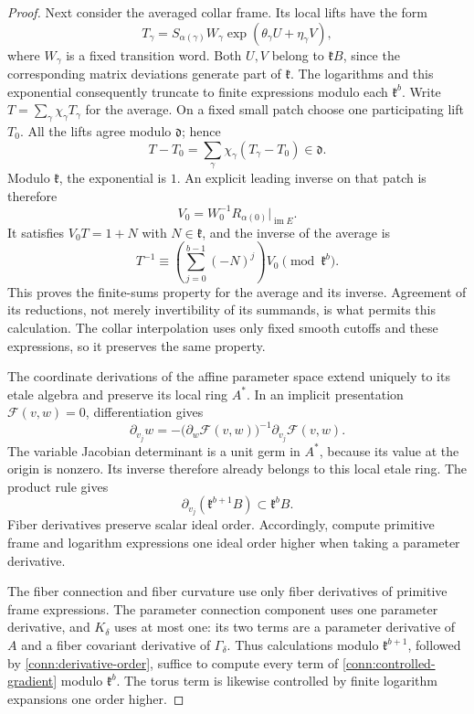 \begin{proof}
Next consider the averaged collar frame.  Its local lifts have
the form
\[
 T_\gamma=S_{\alpha(\gamma)}W_\gamma
                       \exp(\theta_\gamma U+\eta_\gamma V),
\]
where \(W_\gamma\) is a fixed transition word.  Both \(U,V\)
belong to \(\mathfrak kB\), since the corresponding matrix
deviations generate part of \(\mathfrak k\).  The logarithms
and this exponential consequently truncate to finite
expressions modulo each \(\mathfrak k^b\).  Write
\(T=\sum_\gamma\chi_\gamma T_\gamma\) for the average.
On a fixed small patch choose one participating lift \(T_0\).
All the lifts agree modulo \(\mathfrak d\); hence
\[
 T-T_0=\sum_\gamma\chi_\gamma(T_\gamma-T_0)
                                           \in\mathfrak d.
\]
Modulo \(\mathfrak k\), the exponential is \(1\).
An explicit leading inverse on that patch is therefore
\[
 V_0=W_0^{-1}R_{\alpha(0)}
                       \big|_{\operatorname{im}E}.
\]
It satisfies \(V_0T=1+N\) with \(N\in\mathfrak k\), and the
inverse of the average is
\begin{equation}
 T^{-1}\equiv
       \left(\sum_{j=0}^{b-1}(-N)^j\right)V_0
                                      \pmod{\mathfrak k^b}.
 \label{conn:average-inverse}
\end{equation}
This proves the finite-sums property for the average and its
inverse.  Agreement of its reductions, not merely invertibility
of its summands, is what permits this calculation.
The collar interpolation uses only fixed smooth cutoffs and
these expressions, so it preserves the same property.

The coordinate derivations of the affine parameter space
extend uniquely to its etale algebra and preserve its local
ring \(A^*\).  In an implicit presentation $\mathcal F(v,w)=0$, differentiation
gives
\[
 \partial_{v_j}w
 =-\bigl(\partial_w\mathcal F(v,w)\bigr)^{-1}
                           \partial_{v_j}\mathcal F(v,w).
\]
The variable Jacobian determinant is a unit germ in \(A^*\), because
its value at the origin is nonzero.  Its inverse therefore already
belongs to this local etale ring.
The product rule gives
\begin{equation}
 \partial_{v_j}(\mathfrak k^{b+1}B)
                                     \subset\mathfrak k^bB.
 \label{conn:derivative-order}
\end{equation}
Fiber derivatives preserve scalar ideal order.  Accordingly,
compute primitive frame and logarithm expressions one ideal
order higher when taking a parameter derivative.

The fiber connection and fiber curvature use only fiber
derivatives of primitive frame expressions.
The parameter connection component uses one parameter
derivative, and \(K_\delta\) uses at most one: its two terms
are a parameter derivative of \(A\) and a fiber covariant
derivative of \(\Gamma_\delta\).
Thus calculations modulo \(\mathfrak k^{b+1}\), followed by
\eqref{conn:derivative-order}, suffice to compute every term
of \eqref{conn:controlled-gradient} modulo \(\mathfrak k^b\).
The torus term is likewise controlled by finite logarithm
expansions one order higher.


\end{proof}
